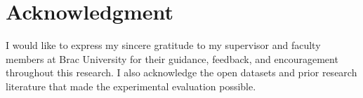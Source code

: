 \chapter*{Acknowledgment}

I would like to express my sincere gratitude to my supervisor and faculty members at Brac University for their guidance, feedback, and encouragement throughout this research. I also acknowledge the open datasets and prior research literature that made the experimental evaluation possible.
